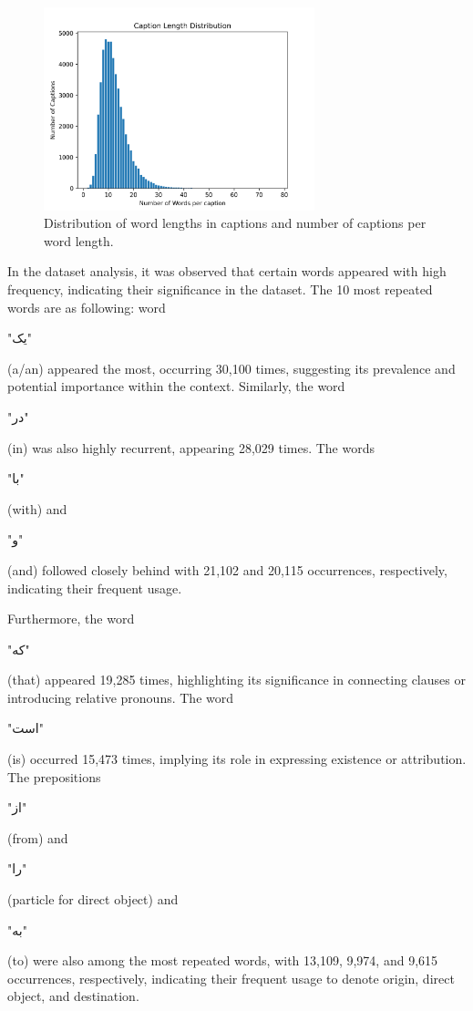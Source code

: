 \documentclass[runningheads]{llncs}
\begin{document}
\begin{figure}
  \begin{center}
    \includegraphics[width=0.7\textwidth]{length_distribution.png}
    \caption{Distribution of word lengths in captions and number of captions per word length.}
    \label{fig3}
  \end{center}
\end{figure}

In the dataset analysis, it was observed that certain words appeared with high frequency, indicating their significance in the dataset. The 10 most repeated words are as following: word \begin{farsi} \arabicfont\small "یک"\end{farsi} (a/an) appeared the most, occurring 30,100 times, suggesting its prevalence and potential importance within the context. Similarly, the word \begin{farsi} \arabicfont\small "در"\end{farsi} (in) was also highly recurrent, appearing 28,029 times. The words \begin{farsi} \arabicfont\small "با"\end{farsi} (with) and \begin{farsi} \arabicfont\small "و"\end{farsi} (and) followed closely behind with 21,102 and 20,115 occurrences, respectively, indicating their frequent usage.

Furthermore, the word \begin{farsi} \arabicfont\small "که"\end{farsi} (that) appeared 19,285 times, highlighting its significance in connecting clauses or introducing relative pronouns. The word \begin{farsi} \arabicfont\small "است"\end{farsi} (is) occurred 15,473 times, implying its role in expressing existence or attribution. The prepositions\begin{farsi} \arabicfont\small "از"\end{farsi} (from) and \begin{farsi} \arabicfont\small "را"\end{farsi} (particle for direct object) and \begin{farsi} \arabicfont\small "به"\end{farsi} (to) were also among the most repeated words, with 13,109, 9,974, and 9,615 occurrences, respectively, indicating their frequent usage to denote origin, direct object, and destination.
\end{document}
